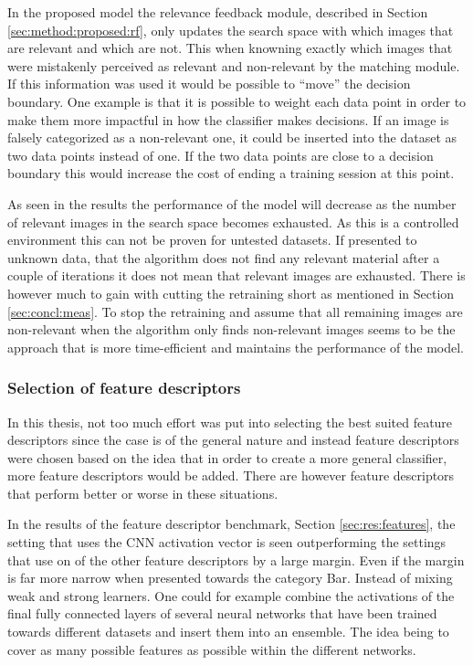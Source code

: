 In the proposed model the relevance feedback module, described in Section \ref{sec:method:proposed:rf}, only updates the search space with which images that are relevant and which are not. This when knowning exactly which images that were mistakenly perceived as relevant and non-relevant by the matching module. If this information was used it would be possible to ``move'' the decision boundary. 
One example is that it is possible to weight each data point in order to make them more impactful in how the classifier makes decisions. If an image is falsely categorized as a non-relevant one, it could be inserted into the dataset as two data points instead of one. If the two data points are close to a decision boundary this would increase the cost of ending a training session at this point. 

As seen in the results the performance of the model will decrease as the number of relevant images in the search space becomes exhausted. As this is a controlled environment this can not be proven for untested datasets. If presented to unknown data, that the algorithm does not find any relevant material after a couple of iterations it does not mean that relevant images are exhausted. There is however much to gain with cutting the retraining short as mentioned in Section \ref{sec:concl:meas}. To stop the retraining and assume that all remaining images are non-relevant when the algorithm only finds non-relevant images seems to be the approach that is more time-efficient and maintains the performance of the model.

\subsubsection{Selection of feature descriptors}
\label{sec:conc:future:model:feat}
In this thesis, not too much effort was put into selecting the best suited feature descriptors since the case is of the general nature and instead feature descriptors were chosen based on the idea that in order to create a more general classifier, more feature descriptors would be added. There are however feature descriptors that perform better or worse in these situations.

In the results of the feature descriptor benchmark, Section \ref{sec:res:features}, the setting that uses the CNN activation vector is seen outperforming the settings that use on of the other feature descriptors by a large margin. Even if the margin is far more narrow when presented towards the category Bar. Instead of mixing weak and strong learners. One could for example combine the activations of the final fully connected layers of several neural networks that have been trained towards different datasets and insert them into an ensemble. The idea being to cover as many possible features as possible within the different networks. 


